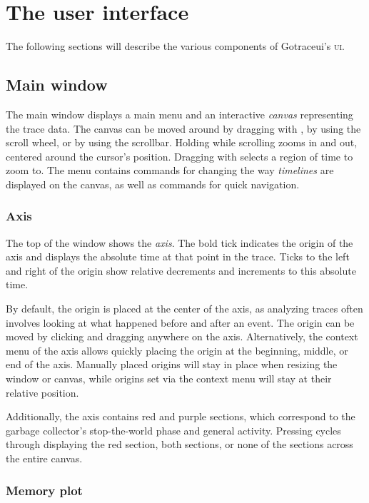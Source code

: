 \documentclass[10pt,letterpaper,oneside,openany,english]{memoir}
\newcommand{\noun}[1]{{\emph{#1}}}
\newcommand{\shortcut}{\ctrl{} or \cmdmac}
\begin{document}
\chapter{The user interface}
The following sections will describe the various components of Gotraceui's \textsc{ui}.

\section{Main window}
The main window displays a main menu and an interactive \noun{canvas} representing the trace data.
The canvas can be moved around by dragging with , by using the scroll wheel, or by using the scrollbar.
Holding \keys{\shortcut} while scrolling zooms in and out, centered around the cursor's position.
Dragging with \keys{\shortcut+LMB} selects a region of time to zoom to.
The  menu contains commands for changing the way \noun{timelines} are displayed on the canvas,
as well as commands for quick navigation.

\subsection{Axis}
The top of the window shows the \noun{axis}.
The bold tick indicates the origin of the axis and displays the absolute time at that point in the trace.
Ticks to the left and right of the origin show relative decrements and increments to this absolute time.

By default, the origin is placed at the center of the axis,
as analyzing traces often involves looking at what happened before and after an event.
The origin can be moved by clicking and dragging anywhere on the axis.
Alternatively, the context menu of the axis allows quickly placing the origin at the beginning, middle, or end of the axis.
Manually placed origins will stay in place when resizing the window or canvas,
while origins set via the context menu will stay at their relative position.

Additionally, the axis contains red and purple sections,
which correspond to the garbage collector's stop-the-world phase and general activity.
Pressing  cycles through displaying the red section, both sections, or none of the sections across the entire canvas.

\subsection{Memory plot}
\end{document}
